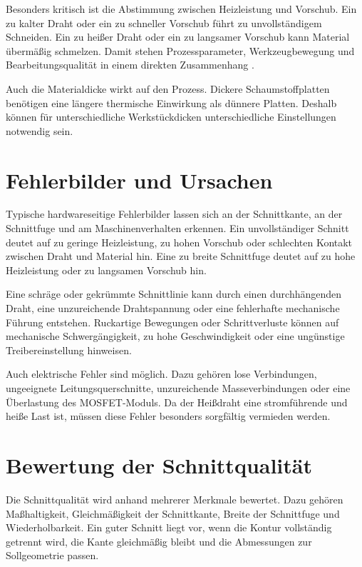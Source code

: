 Besonders kritisch ist die Abstimmung zwischen Heizleistung und Vorschub. Ein zu kalter Draht oder ein zu schneller Vorschub führt zu unvollständigem Schneiden. Ein zu heißer Draht oder ein zu langsamer Vorschub kann Material übermäßig schmelzen. Damit stehen Prozessparameter, Werkzeugbewegung und Bearbeitungsqualität in einem direkten Zusammenhang \cite{Fritz:2022}.

Auch die Materialdicke wirkt auf den Prozess. Dickere Schaumstoffplatten benötigen eine längere thermische Einwirkung als dünnere Platten. Deshalb können für unterschiedliche Werkstückdicken unterschiedliche Einstellungen notwendig sein.

\section{Fehlerbilder und Ursachen}
\label{sec:hardware_fehlerbilder_ursachen}

Typische hardwareseitige Fehlerbilder lassen sich an der Schnittkante, an der Schnittfuge und am Maschinenverhalten erkennen. Ein unvollständiger Schnitt deutet auf zu geringe Heizleistung, zu hohen Vorschub oder schlechten Kontakt zwischen Draht und Material hin. Eine zu breite Schnittfuge deutet auf zu hohe Heizleistung oder zu langsamen Vorschub hin.

Eine schräge oder gekrümmte Schnittlinie kann durch einen durchhängenden Draht, eine unzureichende Drahtspannung oder eine fehlerhafte mechanische Führung entstehen. Ruckartige Bewegungen oder Schrittverluste können auf mechanische Schwergängigkeit, zu hohe Geschwindigkeit oder eine ungünstige Treibereinstellung hinweisen.

Auch elektrische Fehler sind möglich. Dazu gehören lose Verbindungen, ungeeignete Leitungsquerschnitte, unzureichende Masseverbindungen oder eine Überlastung des MOSFET-Moduls. Da der Heißdraht eine stromführende und heiße Last ist, müssen diese Fehler besonders sorgfältig vermieden werden.

\section{Bewertung der Schnittqualität}
\label{sec:bewertung_schnittqualitaet}

Die Schnittqualität wird anhand mehrerer Merkmale bewertet. Dazu gehören Maßhaltigkeit, Gleichmäßigkeit der Schnittkante, Breite der Schnittfuge und Wiederholbarkeit. Ein guter Schnitt liegt vor, wenn die Kontur vollständig getrennt wird, die Kante gleichmäßig bleibt und die Abmessungen zur Sollgeometrie passen.

